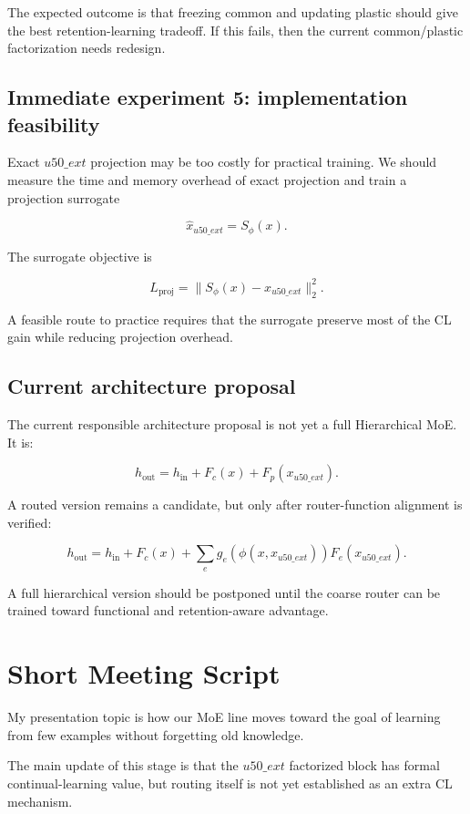 \documentclass[11pt]{article}
\begin{document}
The expected outcome is that freezing common and updating plastic should give the best retention-learning tradeoff. If this fails, then the current common/plastic factorization needs redesign.

\subsection{Immediate experiment 5: implementation feasibility}

Exact $u50\_ext$ projection may be too costly for practical training. We should measure the time and memory overhead of exact projection and train a projection surrogate

$$
\hat{x}_{u50\_ext}=S_\phi(x).
$$

The surrogate objective is

$$
L_{\mathrm{proj}}=\|S_\phi(x)-x_{u50\_ext}\|_2^2.
$$

A feasible route to practice requires that the surrogate preserve most of the CL gain while reducing projection overhead.

\subsection{Current architecture proposal}

The current responsible architecture proposal is not yet a full Hierarchical MoE. It is:

$$
h_{\mathrm{out}}
=
h_{\mathrm{in}}
+
F_c(x)
+
F_p(x_{u50\_ext}).
$$

A routed version remains a candidate, but only after router-function alignment is verified:

$$
h_{\mathrm{out}}
=
h_{\mathrm{in}}
+
F_c(x)
+
\sum_e g_e(\phi(x,x_{u50\_ext}))F_e(x_{u50\_ext}).
$$

A full hierarchical version should be postponed until the coarse router can be trained toward functional and retention-aware advantage.

\section{Short Meeting Script}

My presentation topic is how our MoE line moves toward the goal of learning from few examples without forgetting old knowledge.

The main update of this stage is that the $u50\_ext$ factorized block has formal continual-learning value, but routing itself is not yet established as an extra CL mechanism.
\end{document}
